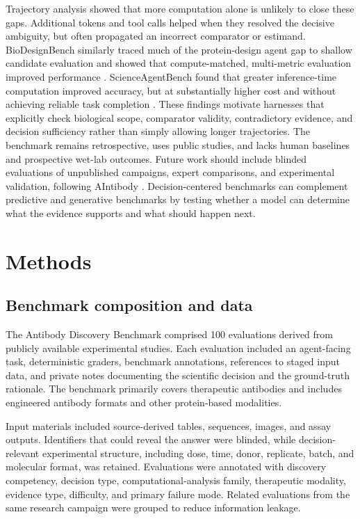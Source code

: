 \documentclass[10pt,letterpaper]{article}
\begin{document}
Trajectory analysis showed that more computation alone is unlikely to close these gaps. Additional tokens and tool calls helped when they resolved the decisive ambiguity, but often propagated an incorrect comparator or estimand. BioDesignBench similarly traced much of the protein-design agent gap to shallow candidate evaluation and showed that compute-matched, multi-metric evaluation improved performance \cite{Kim2026-cr}. ScienceAgentBench found that greater inference-time computation improved accuracy, but at substantially higher cost and without achieving reliable task completion \cite{Chen2024-ov}. These findings motivate harnesses that explicitly check biological scope, comparator validity, contradictory evidence, and decision sufficiency rather than simply allowing longer trajectories. The benchmark remains retrospective, uses public studies, and lacks human baselines and prospective wet-lab outcomes. Future work should include blinded evaluations of unpublished campaigns, expert comparisons, and experimental validation, following AIntibody \cite{Erasmus2026-qb}. Decision-centered benchmarks can complement predictive and generative benchmarks \cite{Huang2021-ei, Chungyoun2025-co, Erasmus2026-qb, Zhao2025-pb, Ahmed2026-uq} by testing whether a model can determine what the evidence supports and what should happen next.


\section{Methods}

\subsection{Benchmark composition and data}
The Antibody Discovery Benchmark comprised 100 evaluations derived from publicly available experimental studies. Each evaluation included an agent-facing task, deterministic graders, benchmark annotations, references to staged input data, and private notes documenting the scientific decision and the ground-truth rationale. The benchmark primarily covers therapeutic antibodies and includes engineered antibody formats and other protein-based modalities.

Input materials included source-derived tables, sequences, images, and assay outputs. Identifiers that could reveal the answer were blinded, while decision-relevant experimental structure, including dose, time, donor, replicate, batch, and molecular format, was retained. Evaluations were annotated with discovery competency, decision type, computational-analysis family, therapeutic modality, evidence type, difficulty, and primary failure mode. Related evaluations from the same research campaign were grouped to reduce information leakage.
\end{document}
